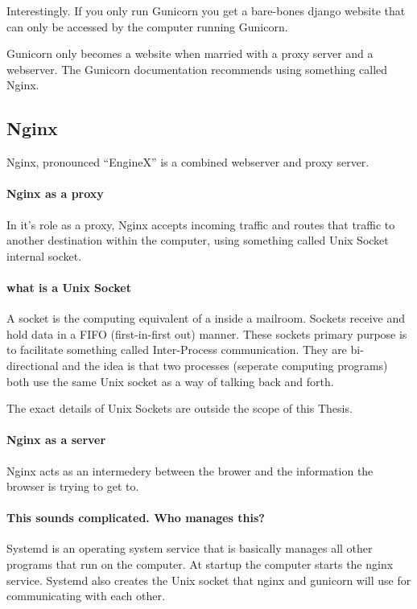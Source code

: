 {Interestingly.  If you only run Gunicorn you get a bare-bones django website that can only be accessed by the computer running Gunicorn.

Gunicorn only becomes a website when married with a proxy server and a webserver.  The Gunicorn documentation recommends using something called Nginx.

\subsection{Nginx}

Nginx, pronounced ``EngineX''  is a combined webserver and proxy server.

\paragraph{Nginx as a proxy}

In it's role as a proxy, Nginx accepts incoming traffic and routes that traffic to another destination within the computer, using something called Unix Socket internal socket.


\paragraph{what is a Unix Socket}

A socket is the computing equivalent of a inside a mailroom.  Sockets receive and hold data in a FIFO (first-in-first out) manner.  These sockets primary purpose is to facilitate something called Inter-Process communication.  They are bi-directional and the idea is that two processes (seperate computing programs) both use the same Unix socket as a way of talking back and forth.

The exact details of Unix Sockets are outside the scope of this Thesis.

\paragraph{Nginx as a server}

Nginx acts as an intermedery between the brower and the information the browser is trying to get to.


\paragraph{This sounds complicated.  Who manages this?}

Systemd is an operating system service that is basically manages all other programs that run on the computer.
At startup the computer starts the nginx service.  Systemd also creates the Unix socket that nginx and gunicorn will use for communicating with each other.

}
